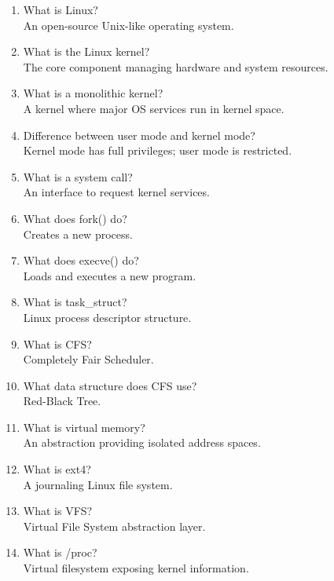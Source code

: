 \begin{enumerate}
\item What is Linux?\\
An open-source Unix-like operating system.

\item What is the Linux kernel?\\
The core component managing hardware and system resources.

\item What is a monolithic kernel?\\
A kernel where major OS services run in kernel space.

\item Difference between user mode and kernel mode?\\
Kernel mode has full privileges; user mode is restricted.

\item What is a system call?\\
An interface to request kernel services.

\item What does fork() do?\\
Creates a new process.

\item What does execve() do?\\
Loads and executes a new program.

\item What is task\_struct?\\
Linux process descriptor structure.

\item What is CFS?\\
Completely Fair Scheduler.

\item What data structure does CFS use?\\
Red-Black Tree.

\item What is virtual memory?\\
An abstraction providing isolated address spaces.

\item What is ext4?\\
A journaling Linux file system.

\item What is VFS?\\
Virtual File System abstraction layer.

\item What is /proc?\\
Virtual filesystem exposing kernel information.


\end{enumerate}
